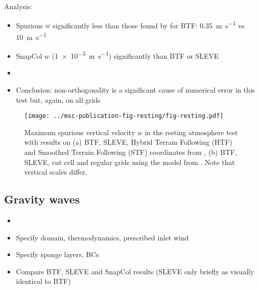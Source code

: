 \documentclass[twocol]{ametsoc}
\begin{document}
Analysis:
\begin{itemize}
	\item Spurious $w$ significantly less than those found by \citet{klemp2011} for BTF: \SI{0.35}{\meter\per\second} vs \SI{10}{\meter\per\second}
	\item SnapCol $w$ (\SI{1e-3}{\meter\per\second}) significantly than BTF or SLEVE
	\item {}
	\item Conclusion: non-orthogonality is a significant cause of numerical error in this test but, again,  on all grids
\end{itemize}

\begin{figure*}
	\centering
	\texttt{[image: ../msc-publication-fig-resting/fig-resting.pdf]}
%
	\caption{Maximum spurious vertical velocity $w$ in the resting atmosphere test with results on (a) BTF, SLEVE, Hybrid Terrain Following (HTF) and Smoothed Terrain Following (STF) coordinates from \citet{klemp2011}, (b) BTF, SLEVE, cut cell and regular grids using the model from \citet{weller-shahrokhi2014}.  Note that vertical scales differ.}
	\label{fig:resting}
\end{figure*}

\subsection{Gravity waves}
\begin{itemize}
	\item {}
	\item Specify domain, thermodynamics, prescribed inlet wind
	\item Specify sponge layers, BCs
	\item Compare BTF, SLEVE and SnapCol results (SLEVE only briefly as visually identical to BTF)
\end{itemize}
\end{document}
